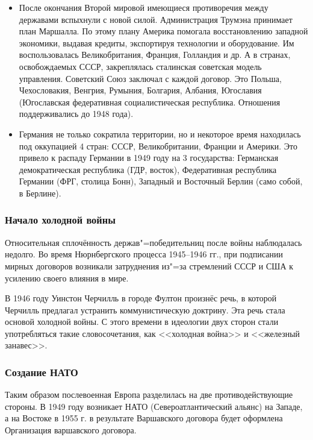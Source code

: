 \begin{itemize}
    \item После окончания Второй мировой имеющиеся противоречия между державами вспыхнули с новой силой. Администрация Трумэна принимает план Маршалла. По этому плану Америка помогала восстановлению западной экономики, выдавая кредиты, экспортируя технологии и оборудование. Им воспользовалась Великобритания, Франция, Голландия и др. А в странах, освобождаемых СССР, закреплялась сталинская советская модель управления. Советский Союз заключал с каждой договор. Это Польша, Чехословакия, Венгрия, Румыния, Болгария, Албания, Югославия (Югославская федеративная социалистическая республика. Отношения поддерживались до 1948 года).
    \item Германия не только сократила территории, но и некоторое время находилась под оккупацией 4 стран: СССР, Великобритании, Франции и Америки. Это привело к распаду Германии в 1949 году на 3 государства: Германская демократическая республика (ГДР, восток), Федеративная республика Германии (ФРГ, столица Бонн), Западный и Восточный Берлин (само собой, в Берлине).
\end{itemize}

\subsubsection{\textbf{Начало холодной войны}}

Относительная сплочённость держав"=победительниц после войны наблюдалась недолго. Во время Нюрнбергского процесса 1945--1946 гг., при подписании мирных договоров возникали затруднения из"=за стремлений СССР и США к усилению своего влияния в мире.

В 1946 году Уинстон Черчилль в городе Фултон произнёс речь, в которой Черчилль предлагал устранить коммунистическую доктрину. Эта речь стала основой холодной войны. С этого времени в идеологии двух сторон стали употребляться такие словосочетания, как <<холодная война>> и <<железный занавес>>. 

\subsubsection{\textbf{Создание НАТО}}

Таким образом послевоенная Европа разделилась на две противодействующие стороны. В 1949 году возникает НАТО (Североатлантический альянс) на Западе, а на Востоке в 1955 г. в результате Варшавского договора будет оформлена Организация варшавского договора. 

